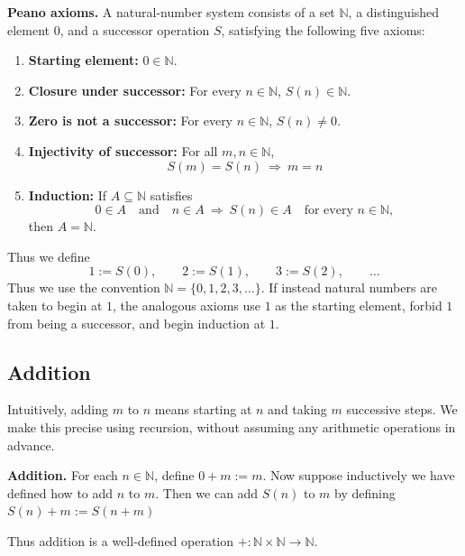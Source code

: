 \documentclass[a4paper,11pt,abstracton]{scrartcl}
\newcommand{\NN}{\mathbb{N}}
\newcommand{\rimply}{\Rightarrow}
\theoremstyle{dotlessP}
\theoremstyle{dotlessS}
\theoremstyle{remark}
\theoremstyle{definition}
\begin{document}
\begin{definition_box}
\textbf{Peano axioms.} A natural-number system consists of a set $\NN$, a
distinguished element $0$, and a successor operation $S$, satisfying the
following five axioms:
\begin{enumerate}[(P1)]
    \item \textbf{Starting element:} $0\in\NN$.

    \item \textbf{Closure under successor:} For every $n\in\NN$,
    $S(n)\in\NN$.

    \item \textbf{Zero is not a successor:} For every $n\in\NN$,
    $S(n)\ne0$.

    \item \textbf{Injectivity of successor:} For all $m,n\in\NN$,
    \[
        S(m)=S(n)\ \rimply\ m=n
    \]

    \item \textbf{Induction:} If $A\subseteq\NN$ satisfies
    \[
        0\in A
        \quad\text{and}\quad
        n\in A\ \rimply\ S(n)\in A
        \quad\text{for every }n\in\NN,
    \]
    then $A=\NN$.
\end{enumerate}
\end{definition_box}

Thus we define
\[
    1:=S(0),\qquad 2:=S(1),\qquad 3:=S(2),\qquad\ldots
\]
Thus we use the convention $\NN=\{0,1,2,3,\ldots\}$. If instead natural
numbers are taken to begin at $1$, the analogous axioms use $1$ as the
starting element, forbid $1$ from being a successor, and begin induction
at $1$.

\subsection{Addition}
\label{subsec:addition}

Intuitively, adding $m$ to $n$ means starting at $n$ and taking $m$
successive steps. We make this precise using recursion, without assuming
any arithmetic operations in advance.

\begin{definition_box}
\textbf{Addition.} For each $n\in\NN$, define $0+m:=m$. Now suppose inductively we have defined how to add $n$ to $m$. Then we can add $S(n)$ to $m$ by defining $S(n)+m:=S(n+m)$
\end{definition_box}

Thus addition is a well-defined operation
$+:\NN\times\NN\to\NN$. 
\end{document}
